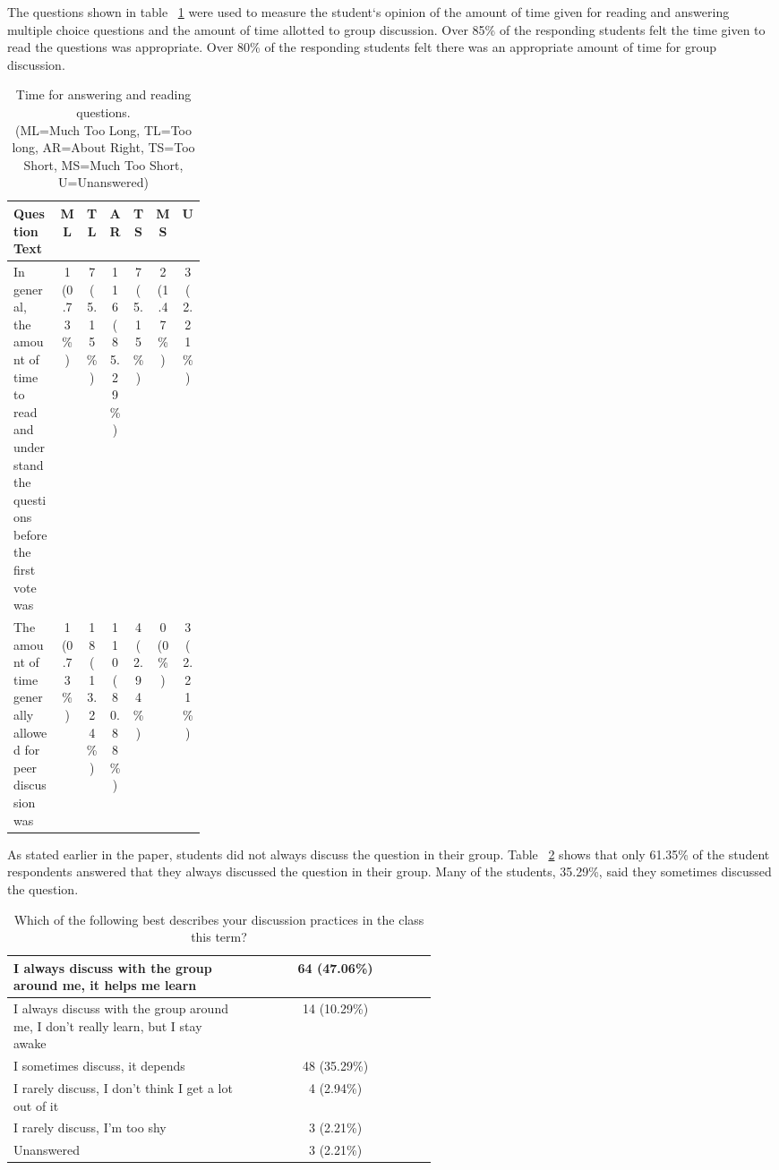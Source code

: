 \documentclass[12pt]{article}
\begin{document}
\restoregeometry


The questions shown in table ~\ref{table:timeForQuestions} were used to measure the student`s opinion of the amount of time given for reading and answering multiple choice questions and the amount of time allotted to group discussion. Over 85\% of the responding students felt the time given to read the questions was appropriate. Over 80\% of the responding students felt there was an appropriate amount of time for group discussion. 

\begin{table}[ht]
\caption{Time for answering and reading questions.\\\hspace{\textwidth} (ML=Much Too Long, TL=Too long, AR=About Right, TS=Too Short, MS=Much Too Short, U=Unanswered)}
\begin{tabular}{p{0.25\linewidth} |c|c|c|c|c|c} %
\toprule
Question Text & ML & TL & AR & TS & MS & U \\ \midrule
\rowcolor{LightGray}
In general, the amount of time to read and understand the questions before the first vote was & 1 (0.73\%) & 7 (5.15\%) & 116 (85.29\%) & 7 (5.15\%) & 2 (1.47\%) & 3 (2.21\%) \\ \midrule
The amount of time generally allowed for peer discussion was & 1 (0.73\%) & 18 (13.24\%) & 110 (80.88\%) & 4 (2.94\%) & 0 (0\%) & 3 (2.21\%) \\ \bottomrule
\end{tabular}
\label{table:timeForQuestions}
\end{table}

As stated earlier in the paper, students did not always discuss the question in their group. Table ~\ref{table:groupDiscussion} shows that only 61.35\% of the student respondents answered that they always discussed the question in their group. Many of the students, 35.29\%, said they sometimes discussed the question. 

\begin{table}[ht]
\caption{Which of the following best describes your discussion practices in the class this term?}
\begin{tabular}{p{0.55\linewidth}|c} %
\toprule
 \rowcolor{LightGray} 
 I always discuss with the group around me, it helps me learn & 64 (47.06\%)\\\midrule 
 I always discuss with the group around me, I don't really learn, but I stay awake & 14 (10.29\%)\\\midrule 
 \rowcolor{LightGray}
 I sometimes discuss, it depends & 48 (35.29\%)\\\midrule 
 I rarely discuss, I don't think I get a lot out of it & 4 (2.94\%)\\\midrule 
 \rowcolor{LightGray}
 I rarely discuss, I'm too shy & 3 (2.21\%)\\\midrule 
 Unanswered & 3 (2.21\%)\\\bottomrule 
\end{tabular}
\label{table:groupDiscussion}
\end{table}
\end{document}
